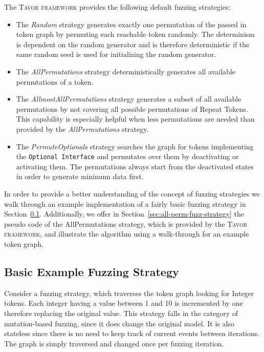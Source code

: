The \textsc{Tavor framework} provides the following default fuzzing strategies:
\begin{itemize}
\item The \emph{Random} strategy generates exactly one permutation of the passed in token graph by permuting each reachable token randomly. The determinism is dependent on the random generator and is therefore deterministic if the same random seed is used for initializing the random generator.
\item The \emph{AllPermutations} strategy deterministically generates all available permutations of a token.
\item The \emph{AllmostAllPermutations} strategy generates a subset of all available permutations by not covering all possible permutations of Repeat Tokens. This capability is especially helpful when less permutations are needed than provided by the \emph{AllPermutations} strategy.
\item The \emph{PermuteOptionals} strategy searches the graph for tokens implementing the \texttt{Optional Interface} and permutates over them by deactivating or activating them. The permutations always start from the deactivated states in order to generate minimum data first.
\end{itemize}

In order to provide a better understanding of the concept of fuzzing strategies we walk through an example implementation of a fairly basic fuzzing strategy in Section~\ref{sec:basic-fuzz-strategy}. Additionally, we offer in Section~\ref{sec:all-perm-fuzz-strategy} the pseudo code of the AllPermutations strategy, which is provided by the \textsc{Tavor framework}, and illustrate the algorithm using a walk-through for an example token graph.

\subsection{Basic Example Fuzzing Strategy}
\label{sec:basic-fuzz-strategy}

Consider a fuzzing strategy, which traverses the token graph looking for Integer tokens. Each integer having a value between 1 and 10 is incremented by one therefore replacing the original value. This strategy falls in the category of mutation-based fuzzing, since it does change the original model. It is also stateless since there is no need to keep track of current events between iterations. The graph is simply traversed and changed once per fuzzing iteration.

